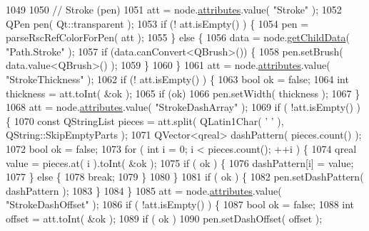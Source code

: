 \begin{DoxyCode}
1049 
1050     \textcolor{comment}{// Stroke (pen)}
1051     att = node.\hyperlink{classXpsRenderNode_a7f6fca2e06dd119e7eb20139af6c8477}{attributes}.value( \textcolor{stringliteral}{"Stroke"} );
1052     QPen pen( Qt::transparent );
1053     \textcolor{keywordflow}{if}  (! att.isEmpty() ) \{
1054         pen = parseRscRefColorForPen( att );
1055     \} \textcolor{keywordflow}{else} \{
1056         data = node.\hyperlink{classXpsRenderNode_a7b201a5c93024bcb63ebb6e913a010f8}{getChildData}( \textcolor{stringliteral}{"Path.Stroke"} );
1057         \textcolor{keywordflow}{if} (data.canConvert<QBrush>()) \{
1058             pen.setBrush( data.value<QBrush>() );
1059         \}
1060     \}
1061     att = node.\hyperlink{classXpsRenderNode_a7f6fca2e06dd119e7eb20139af6c8477}{attributes}.value( \textcolor{stringliteral}{"StrokeThickness"} );
1062     \textcolor{keywordflow}{if}  (! att.isEmpty() ) \{
1063         \textcolor{keywordtype}{bool} ok = \textcolor{keyword}{false};
1064         \textcolor{keywordtype}{int} thickness = att.toInt( &ok );
1065         \textcolor{keywordflow}{if} (ok)
1066             pen.setWidth( thickness );
1067     \}
1068     att = node.\hyperlink{classXpsRenderNode_a7f6fca2e06dd119e7eb20139af6c8477}{attributes}.value( \textcolor{stringliteral}{"StrokeDashArray"} );
1069     \textcolor{keywordflow}{if}  ( !att.isEmpty() ) \{
1070         \textcolor{keyword}{const} QStringList pieces = att.split( QLatin1Char( \textcolor{charliteral}{' '} ), QString::SkipEmptyParts );
1071         QVector<qreal> dashPattern( pieces.count() );
1072         \textcolor{keywordtype}{bool} ok = \textcolor{keyword}{false};
1073         \textcolor{keywordflow}{for} ( \textcolor{keywordtype}{int} i = 0; i < pieces.count(); ++i ) \{
1074             qreal value = pieces.at( i ).toInt( &ok );
1075             \textcolor{keywordflow}{if} ( ok ) \{
1076                 dashPattern[i] = value;
1077             \} \textcolor{keywordflow}{else} \{
1078                 \textcolor{keywordflow}{break};
1079             \}
1080         \}
1081         \textcolor{keywordflow}{if} ( ok ) \{
1082             pen.setDashPattern( dashPattern );
1083         \}
1084     \}
1085     att = node.\hyperlink{classXpsRenderNode_a7f6fca2e06dd119e7eb20139af6c8477}{attributes}.value( \textcolor{stringliteral}{"StrokeDashOffset"} );
1086     \textcolor{keywordflow}{if}  ( !att.isEmpty() ) \{
1087         \textcolor{keywordtype}{bool} ok = \textcolor{keyword}{false};
1088         \textcolor{keywordtype}{int} offset = att.toInt( &ok );
1089         \textcolor{keywordflow}{if} ( ok )
1090             pen.setDashOffset( offset );

\end{DoxyCode}
